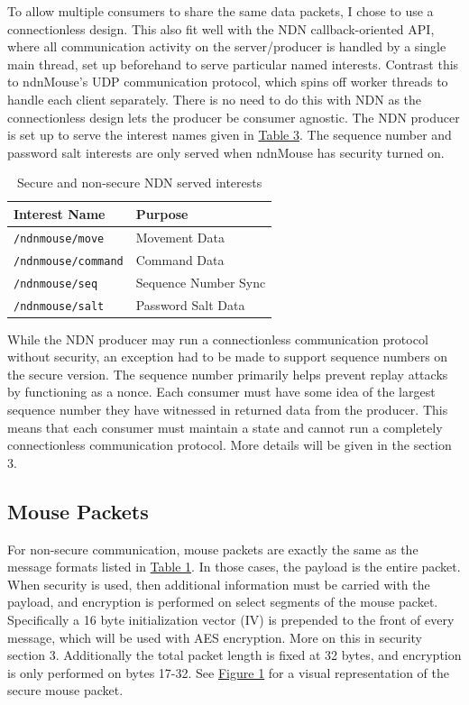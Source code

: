 \documentclass{sig-alternate}
\renewcommand\_{\textunderscore\allowbreak}  %
\begin{document}
To allow multiple consumers to share the same data packets, I chose to use a connectionless design. This also fit well with the NDN callback-oriented API, where all communication activity on the server/producer is handled by a single main thread, set up beforehand to serve particular named interests. Contrast this to ndnMouse's UDP communication protocol, which spins off worker threads to handle each client separately. There is no need to do this with NDN as the connectionless design lets the producer be consumer agnostic. The NDN producer is set up to serve the interest names given in \hyperlink{tab:ndnInterestNames}{Table 3}. The sequence number and password salt interests are only served when ndnMouse has security turned on.

\begin{table}
	\hypertarget{tab:ndnInterestNames}{}
	\begin{center}
		\begin{tabular}{| l | l |}
			\hline
			 Interest Name & Purpose \\ \hline\hline
			\texttt{/ndnmouse/move} & Movement Data\\ \hline
			\texttt{/ndnmouse/command} & Command Data\\ \hline
			\texttt{/ndnmouse/seq} & Sequence Number Sync\\ \hline
			\texttt{/ndnmouse/salt} & Password Salt Data\\ \hline
		\end{tabular}
		\caption{Secure and non-secure NDN served interests}
	\end{center}
\end{table}

While the NDN producer may run a connectionless communication protocol without security, an exception had to be made to support sequence numbers on the secure version. The sequence number primarily helps prevent replay attacks by functioning as a nonce. Each consumer must have some idea of the largest sequence number they have witnessed in returned data from the producer. This means that each consumer must maintain a state and cannot run a completely connectionless communication protocol. More details will be given in the section 3.

\subsection{Mouse Packets}
For non-secure communication, mouse packets are exactly the same as the message formats listed in \hyperlink{tab:msgFormat}{Table 1}. In those cases, the payload is the entire packet. When security is used, then additional information must be carried with the payload, and encryption is performed on select segments of the mouse packet. Specifically a 16 byte initialization vector (IV) is prepended to the front of every message, which will be used with AES encryption. More on this in security section 3. Additionally the total packet length is fixed at 32 bytes, and encryption is only performed on bytes 17-32. See \hyperlink{fig:mousePacketDescription}{Figure 1} for a visual representation of the secure mouse packet.
\end{document}
